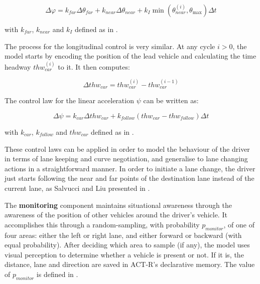 \begin{equation}
	\Delta \varphi = k_{far} \Delta \theta_{far} + k_{near} \Delta \theta_{near} + k_I \min{(\theta_{near}^{(i)}, \theta_{\max})} \Delta t
\end{equation}

with $k_{far}$, $k_{near}$ and $k_{I}$ defined as in \cite{salvucci_1}.

The process for the longitudinal control is very similar. At any cycle $i > 0$, the model starts by encoding the position of the lead vehicle and calculating the time headway $thw_{car}^{(i)}$ to it. It then computes:

\begin{equation}
	\Delta thw_{car} = thw_{car}^{(i)} - thw_{car}^{(i-1)}
\end{equation}

The control law for the linear acceleration $\psi$ can be written as:

\begin{equation}
	\Delta \psi = k_{car} \Delta thw_{car} + k_{follow} (thw_{car} - thw_{follow})\Delta t
\end{equation}

with $k_{car}$, $k_{follow}$ and $thw_{car}$ defined as in \cite{salvucci_1}.

These control laws can be applied in order to model the behaviour of the driver in terms of lane keeping and curve negotiation, and generalise to lane changing actions in a straightforward manner. In order to initiate a lane change, the driver just starts following the near and far points of the destination lane instead of the current lane, as Salvucci and Liu presented in \cite{older_3}.

The \textbf{monitoring} component maintains situational awareness through the awareness of the position of other vehicles around the driver's vehicle. It accomplishes this through a random-sampling, with probability $p_{monitor}$, of one of four areas: either the left or right lane, and either forward or backward (with equal probability). After deciding which area to sample (if any), the model uses visual perception to determine whether a vehicle is present or not. If it is, the distance, lane and direction are saved in ACT-R's declarative memory. The value of $p_{monitor}$ is defined in \cite{salvucci_1}.

